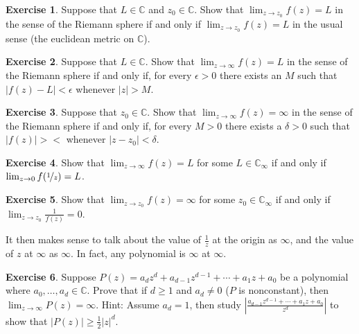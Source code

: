 \documentclass[12pt,openany]{book}
\newcommand{\sabs}[1]{\lvert {#1} \rvert}
\newcommand{\abs}[1]{\left\lvert {#1} \right\rvert}
\newcommand{\C}{{\mathbb{C}}}
\theoremstyle{plain}
\theoremstyle{remark}
\theoremstyle{definition}
\newenvironment{exbox}{%
    \def\FrameCommand{\vrule width 1pt \relax\hspace {10pt}}%
    \MakeFramed {\advance \hsize -\width \FrameRestore }%
}{%
    \endMakeFramed
}
\theoremstyle{exercise}
\newtheorem{exercise}{Exercise}[section]
\theoremstyle{example}
\begin{document}
\begin{exbox}
\begin{exercise}
Suppose that $L \in \C$ and $z_0 \in \C$.
Show that $\lim_{z\to z_0} f(z) = L$ in the sense of the Riemann sphere
if and only if $\lim_{z \to z_0} f(z) = L$ in the usual sense (the euclidean
metric on $\C$).
\end{exercise}

\begin{exercise}
Suppose that $L \in \C$.
Show that $\lim_{z\to \infty} f(z) = L$ in the sense of the Riemann sphere
if and only if, for every $\epsilon > 0$ there exists an $M$ such that
$\sabs{f(z)-L} < \epsilon$ whenever $\sabs{z} > M$.
\end{exercise}

\begin{exercise}
Suppose that $z_0 \in \C$.
Show that $\lim_{z\to \infty} f(z) = \infty$ in the sense of the Riemann sphere
if and only if, for every $M > 0$ there exists a $\delta > 0$ such that
$\sabs{f(z)} > <$ whenever $\sabs{z-z_0} < \delta$.
\end{exercise}

\begin{exercise}
Show that $\lim_{z\to\infty} f(z) = L$ for some $L \in \C_\infty$ if and only if
$\lim_{z \to 0} f(\nicefrac{1}{z}) = L$.
\end{exercise}

\begin{exercise}
Show that $\lim_{z\to z_0} f(z) = \infty$ for some $z_0 \in \C_\infty$ if and only if
$\lim_{z \to z_0} \frac{1}{f(z)} = 0$.
\end{exercise}
\end{exbox}

It then makes sense to talk about the value of $\frac{1}{z}$ at the origin
as $\infty$, and the value of $z$ at $\infty$ as $\infty$.
In fact, any polynomial is $\infty$ at $\infty$.

\begin{exbox}
\begin{exercise} \label{exercise:polygoesinf}
Suppose $P(z) = a_d z^d + a_{d-1} z^{d-1} + \cdots + a_1 z + a_0$ be
a polynomial where $a_0,\ldots,a_d \in \C$.  Prove that if $d \geq 1$
and $a_d \not=0$ ($P$ is nonconstant),
then $\lim_{z \to \infty} P(z) = \infty$.
Hint: Assume $a_d = 1$, then study
$\abs{\frac{a_{d-1} z^{d-1} + \cdots + a_1 z + a_0}{z^d}}$ to show that
$\abs{P(z)} \geq \frac{1}{2} \sabs{z}^d$.
\end{exercise}
\end{exbox}
\end{document}
